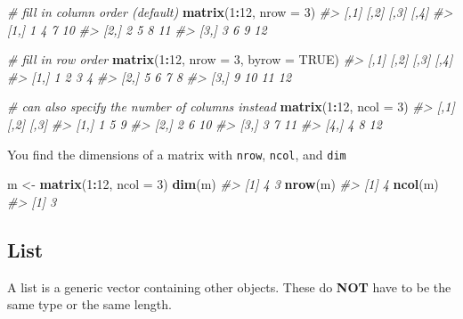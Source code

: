 \documentclass[]{book}
\newenvironment{Shaded}{\begin{snugshade}}{\end{snugshade}}
\newcommand{\KeywordTok}[1]{\textcolor[rgb]{0.13,0.29,0.53}{\textbf{#1}}}
\newcommand{\DataTypeTok}[1]{\textcolor[rgb]{0.13,0.29,0.53}{#1}}
\newcommand{\DecValTok}[1]{\textcolor[rgb]{0.00,0.00,0.81}{#1}}
\newcommand{\StringTok}[1]{\textcolor[rgb]{0.31,0.60,0.02}{#1}}
\newcommand{\CommentTok}[1]{\textcolor[rgb]{0.56,0.35,0.01}{\textit{#1}}}
\newcommand{\OtherTok}[1]{\textcolor[rgb]{0.56,0.35,0.01}{#1}}
\newcommand{\OperatorTok}[1]{\textcolor[rgb]{0.81,0.36,0.00}{\textbf{#1}}}
\newcommand{\NormalTok}[1]{#1}
\theoremstyle{definition}
\theoremstyle{definition}
\theoremstyle{definition}
\theoremstyle{remark}
\begin{document}
\begin{Shaded}
\begin{Highlighting}[]
\CommentTok{# fill in column order (default)}
\KeywordTok{matrix}\NormalTok{(}\DecValTok{1}\OperatorTok{:}\DecValTok{12}\NormalTok{, }\DataTypeTok{nrow =} \DecValTok{3}\NormalTok{)}
\CommentTok{#>      [,1] [,2] [,3] [,4]}
\CommentTok{#> [1,]    1    4    7   10}
\CommentTok{#> [2,]    2    5    8   11}
\CommentTok{#> [3,]    3    6    9   12}

\CommentTok{# fill in row order}
\KeywordTok{matrix}\NormalTok{(}\DecValTok{1}\OperatorTok{:}\DecValTok{12}\NormalTok{, }\DataTypeTok{nrow =} \DecValTok{3}\NormalTok{, }\DataTypeTok{byrow =} \OtherTok{TRUE}\NormalTok{)}
\CommentTok{#>      [,1] [,2] [,3] [,4]}
\CommentTok{#> [1,]    1    2    3    4}
\CommentTok{#> [2,]    5    6    7    8}
\CommentTok{#> [3,]    9   10   11   12}

\CommentTok{# can also specify the number of columns instead}
\KeywordTok{matrix}\NormalTok{(}\DecValTok{1}\OperatorTok{:}\DecValTok{12}\NormalTok{, }\DataTypeTok{ncol =} \DecValTok{3}\NormalTok{)}
\CommentTok{#>      [,1] [,2] [,3]}
\CommentTok{#> [1,]    1    5    9}
\CommentTok{#> [2,]    2    6   10}
\CommentTok{#> [3,]    3    7   11}
\CommentTok{#> [4,]    4    8   12}
\end{Highlighting}
\end{Shaded}

You find the dimensions of a matrix with \texttt{nrow}, \texttt{ncol},
and \texttt{dim}

\begin{Shaded}
\begin{Highlighting}[]
\NormalTok{m <-}\StringTok{ }\KeywordTok{matrix}\NormalTok{(}\DecValTok{1}\OperatorTok{:}\DecValTok{12}\NormalTok{, }\DataTypeTok{ncol =} \DecValTok{3}\NormalTok{)}
\KeywordTok{dim}\NormalTok{(m)}
\CommentTok{#> [1] 4 3}
\KeywordTok{nrow}\NormalTok{(m)}
\CommentTok{#> [1] 4}
\KeywordTok{ncol}\NormalTok{(m)}
\CommentTok{#> [1] 3}
\end{Highlighting}
\end{Shaded}

\subsection{List}\label{list}

A list is a generic vector containing other objects. These do
\textbf{NOT} have to be the same type or the same length.
\end{document}
